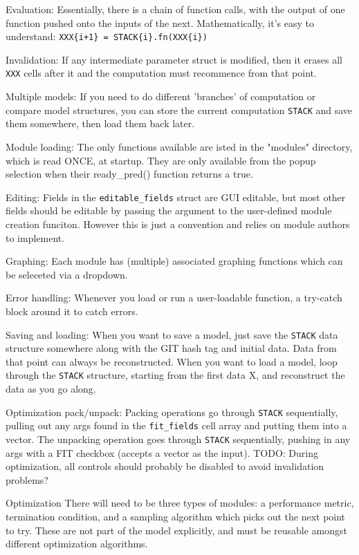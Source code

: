 \documentclass[letterpaper]{report}
\newcommand{\matlab}[1]{\texttt{#1}}
\begin{document}
\begin{description}
\item {Evaluation: } Essentially, there is a chain of function calls, with the output of one function pushed onto the inputs of the next. Mathematically, it's easy to understand: \matlab{XXX\{i+1\} = STACK\{i\}.fn(XXX\{i\})}
\item {Invalidation: } If any intermediate parameter struct is modified, then it erases all \matlab{XXX} cells after it and the computation must recommence from that point. 
\item {Multiple models: } If you need to do different 'branches' of computation or compare model structures, you can store the current computation \matlab{STACK} and save them somewhere, then load them back later.
\item {Module loading: } The only functions available are isted in the "modules" directory, which is read ONCE, at startup. They are only available from the popup selection when their ready\_pred() function returns a true. 
\item {Editing: } Fields in the \matlab{editable\_fields} struct are GUI editable, but most other fields should be editable by passing the argument to the user-defined module creation funciton. However this is just a convention and relies on module authors to implement.
\item {Graphing: } Each module has (multiple) associated graphing functions which can be seleceted via a dropdown.
\item {Error handling: } Whenever you load or run a user-loadable function, a try-catch block around it to catch errors.
\item {Saving and loading: } When you want to save a model, just save the \matlab{STACK} data structure somewhere along with the GIT hash tag and initial data. Data from that point can always be reconstructed. When you want to load a model, loop through the \matlab{STACK} structure, starting from the first data X, and reconstruct the data as you go along.
\item {Optimization pack/unpack: } Packing operations go through \matlab{STACK} sequentially, pulling out any args found in the \matlab{fit\_fields} cell array and putting them into a vector. The unpacking operation goes through \matlab{STACK} sequentially, pushing in any args with a FIT checkbox (accepts a vector as the input). TODO: During optimization, all controls should probably be disabled to avoid invalidation problems?
\item {Optimization} There will need to be three types of modules: a performance metric, termination condition, and a sampling algorithm which picks out the next point to try. These are not part of the model explicitly, and must be reusable amongst different optimization algorithms. 
\end{description}
\end{document}
